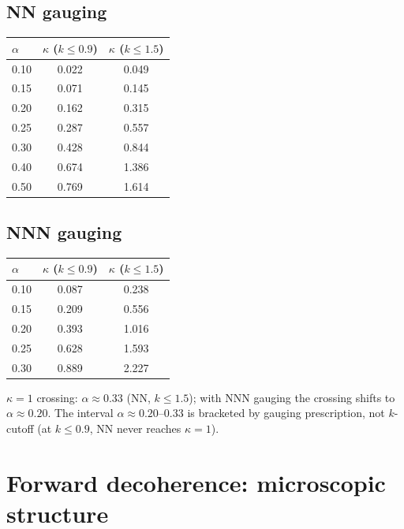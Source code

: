 \documentclass[11pt]{article}
\begin{document}
\subsection{NN gauging}

\begin{table}[h]
\begin{tabular}{lcc}
\hline
$\alpha$ & $\kappa$ ($k \leq 0.9$) & $\kappa$ ($k \leq 1.5$) \\
\hline
0.10 & 0.022 & 0.049 \\
0.15 & 0.071 & 0.145 \\
0.20 & 0.162 & 0.315 \\
0.25 & 0.287 & 0.557 \\
0.30 & 0.428 & 0.844 \\
0.40 & 0.674 & 1.386 \\
0.50 & 0.769 & 1.614 \\
\hline
\end{tabular}
\end{table}

\subsection{NNN gauging}

\begin{table}[h]
\begin{tabular}{lcc}
\hline
$\alpha$ & $\kappa$ ($k \leq 0.9$) & $\kappa$ ($k \leq 1.5$) \\
\hline
0.10 & 0.087 & 0.238 \\
0.15 & 0.209 & 0.556 \\
0.20 & 0.393 & 1.016 \\
0.25 & 0.628 & 1.593 \\
0.30 & 0.889 & 2.227 \\
\hline
\end{tabular}
\end{table}

$\kappa = 1$ crossing: $\alpha \approx 0.33$ (NN, $k \leq 1.5$); with NNN
gauging the crossing shifts to $\alpha \approx 0.20$. The interval
$\alpha \approx 0.20$--$0.33$ is bracketed by gauging prescription, not
$k$-cutoff (at $k \leq 0.9$, NN never reaches $\kappa = 1$).

\section{Forward decoherence: microscopic structure}
\label{sec:forward}
\end{document}
